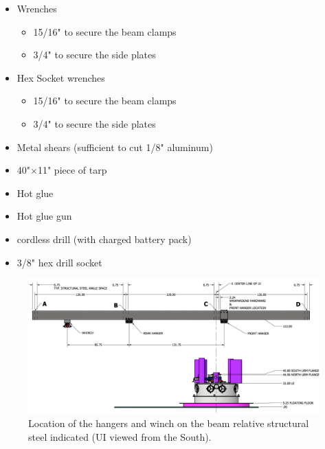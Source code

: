 \documentclass[11pt]{article}
\begin{document}
\begin{itemize}
\begin{itemize}
	\end{itemize}
\item Wrenches
	\begin{itemize}
	\item 15/16" to secure the beam clamps
	\item 3/4" to secure the side plates
	\end{itemize}
\item Hex Socket wrenches
	\begin{itemize}
	\item 15/16" to secure the beam clamps
	\item 3/4" to secure the side plates
	\end{itemize}
\item Metal shears (sufficient to cut 1/8" aluminum)
\item 40"$\times$11" piece of tarp
\item Hot glue
\item Hot glue gun
\item cordless drill (with charged battery pack)
\item 3/8" hex drill socket
\end{itemize}

\begin{figure}[htbp]
\begin{center}
\includegraphics[width=\textwidth]{HangerBeamDimensions.png}
\caption{Location of the hangers and winch on the beam relative structural steel indicated (UI viewed from the South).}
\label{fig:hangerloc}
\end{center}
\end{figure}
\end{document}
